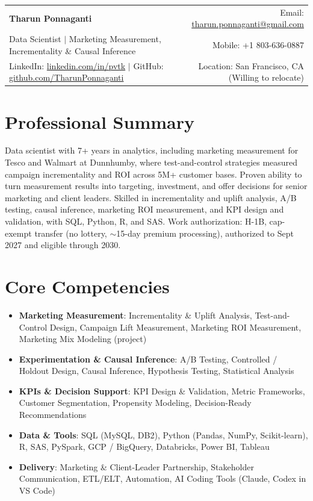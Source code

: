 \documentclass[10pt,letterpaper]{article}
\newcommand{\plainListStart}{\begin{itemize}[leftmargin=0.12in, label=\textbullet, itemsep=0pt, topsep=1pt, parsep=0pt, partopsep=0pt]}
\newcommand{\plainListEnd}{\end{itemize}}
\begin{document}
\begin{tabular*}{\linewidth}{@{}l@{\extracolsep{\fill}}r@{}}
  {\Large\textbf{Tharun Ponnaganti}} & \small Email: \href{mailto:tharun.ponnaganti@gmail.com}{tharun.ponnaganti@gmail.com} \\
  \small Data Scientist $|$ Marketing Measurement, Incrementality \& Causal Inference & \small Mobile: +1 803-636-0887 \\
  \small LinkedIn: \href{https://www.linkedin.com/in/pvtk}{linkedin.com/in/pvtk} $|$ GitHub: \href{https://github.com/TharunPonnaganti}{github.com/TharunPonnaganti} & \small Location: San Francisco, CA (Willing to relocate) \\
\end{tabular*}

\section{Professional Summary}
\small
Data scientist with 7+ years in analytics, including marketing measurement for Tesco and Walmart at Dunnhumby, where test-and-control strategies measured campaign incrementality and ROI across 5M+ customer bases. Proven ability to turn measurement results into targeting, investment, and offer decisions for senior marketing and client leaders. Skilled in incrementality and uplift analysis, A/B testing, causal inference, marketing ROI measurement, and KPI design and validation, with SQL, Python, R, and SAS. Work authorization: H-1B, cap-exempt transfer (no lottery, $\sim$15-day premium processing), authorized to Sept 2027 and eligible through 2030.
\normalsize

\section{Core Competencies}
\plainListStart
  \item\small\textbf{Marketing Measurement}: Incrementality \& Uplift Analysis, Test-and-Control Design, Campaign Lift Measurement, Marketing ROI Measurement, Marketing Mix Modeling (project)
  \item\small\textbf{Experimentation \& Causal Inference}: A/B Testing, Controlled / Holdout Design, Causal Inference, Hypothesis Testing, Statistical Analysis
  \item\small\textbf{KPIs \& Decision Support}: KPI Design \& Validation, Metric Frameworks, Customer Segmentation, Propensity Modeling, Decision-Ready Recommendations
  \item\small\textbf{Data \& Tools}: SQL (MySQL, DB2), Python (Pandas, NumPy, Scikit-learn), R, SAS, PySpark, GCP / BigQuery, Databricks, Power BI, Tableau
  \item\small\textbf{Delivery}: Marketing \& Client-Leader Partnership, Stakeholder Communication, ETL/ELT, Automation, AI Coding Tools (Claude, Codex in VS Code)
\plainListEnd
\end{document}
